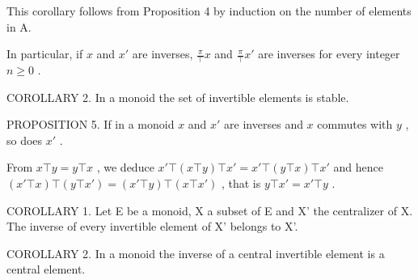 This corollary follows from Proposition 4 by induction on the number of elements in A.

In particular, if \(x\) and \(x'\) are inverses, \(\frac{\pi}{\top} x\) and \(\frac{\pi}{\top} x'\) are inverses for every integer \(n \geqslant 0\) .

COROLLARY 2. In a monoid the set of invertible elements is stable.

PROPOSITION 5. If in a monoid \(x\) and \(x'\) are inverses and \(x\) commutes with \(y\) , so does \(x'\) .

From \(x \top y = y \top x\) , we deduce \(x' \top (x \top y) \top x' = x' \top (y \top x) \top x'\) and hence \((x' \top x) \top (y \top x') = (x' \top y) \top (x \top x')\) , that is \(y \top x' = x' \top y\) .

COROLLARY 1. Let E be a monoid, X a subset of E and X' the centralizer of X. The inverse of every invertible element of X' belongs to X'.

COROLLARY 2. In a monoid the inverse of a central invertible element is a central element.

